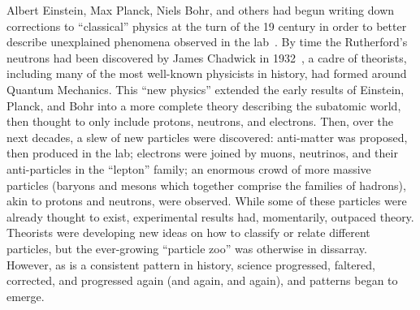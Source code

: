 \begin{dissertationintroduction}
Albert Einstein, Max Planck, Niels Bohr, and others had begun writing down corrections to ``classical'' physics at the turn of the 19 century in order to better describe unexplained phenomena observed in the lab~\cite{EinsteinPhotoelectric, Planck, Bohr}. 
By time the Rutherford's neutrons had been discovered by James Chadwick in 1932~\cite{Chadwick1932}, a cadre of theorists, including many of the most well-known physicists in history\footnotemark{}, had formed around Quantum Mechanics.
This ``new physics'' extended the early results of Einstein, Planck, and Bohr into a more complete theory describing the subatomic world, then thought to only include protons, neutrons, and electrons. 
Then, over the next decades, a slew of new particles were discovered: 
anti-matter was proposed, then produced in the lab; %
electrons were joined by muons, neutrinos, and their anti-particles in the ``lepton'' family; %
an enormous crowd of more massive particles (baryons and mesons which together comprise the families of hadrons), akin to protons and neutrons, were observed. %
While some of these particles were already thought to exist, experimental results had, momentarily, outpaced theory. 
Theorists were developing new ideas on how to classify or relate different particles, but the ever-growing ``particle zoo'' was otherwise in dissarray. 
However, as is a consistent pattern in history, science progressed, faltered, corrected, and progressed again (and again, and again), and patterns began to emerge. 


\end{dissertationintroduction}

